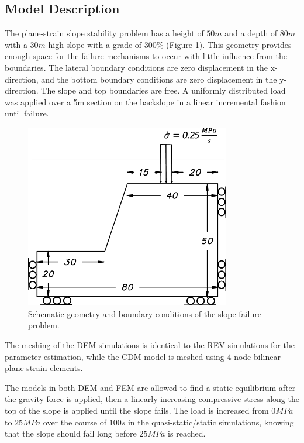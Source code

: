 \subsection{Model Description}

The plane-strain slope stability problem has a height of $50m$ and a depth of $80m$ with a $30m$ high slope with a grade of $300\%$ (Figure \ref{fig:slopeGeom}). This geometry provides enough space for the failure mechanisms to occur with little influence from the boundaries. The lateral boundary conditions are zero displacement in the x-direction, and the bottom boundary conditions are zero displacement in the y-direction. The slope and top boundaries are free. A uniformly distributed load was applied over a 5m section on the backslope in a linear incremental fashion until failure.


\begin{figure}[!htb]
\begin{center}
\includegraphics[width=0.8\textwidth]{figures/slope diagram1/SlopeSchematic}
\caption{{\label{fig:slopeGeom} Schematic geometry and boundary conditions of the slope failure problem.%
}}
\end{center}
\end{figure}

The meshing of the DEM simulations is identical to the REV simulations for the parameter estimation, while the CDM model is meshed using 4-node bilinear plane strain elements.

The models in both DEM and FEM are allowed to find a static equilibrium after the gravity force is applied, then a linearly increasing compressive stress along the top of the slope is applied until the slope fails. The load is increased from $0MPa$ to $25 MPa$ over the course of $100s$ in the quasi-static/static simulations, knowing that the slope should fail long before $25MPa$ is reached.


